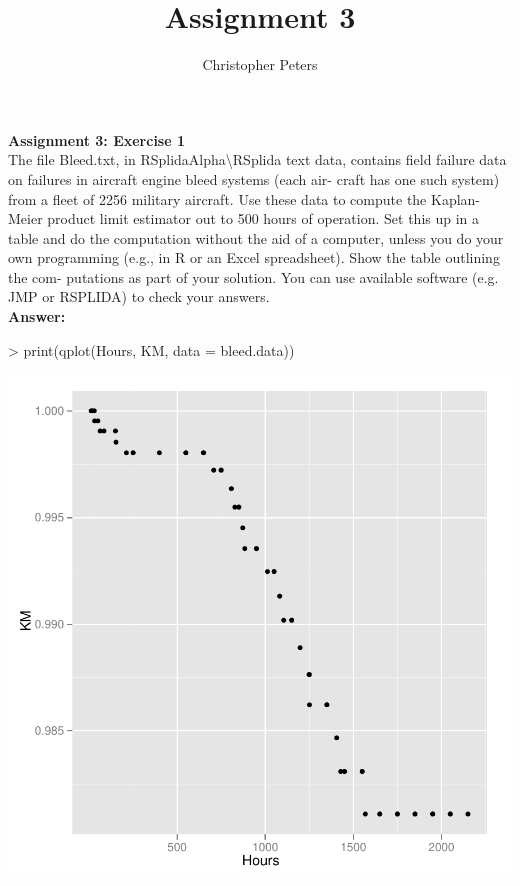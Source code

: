 \documentclass{article}
\begin{document}
\title{Assignment 3}
\author{Christopher Peters}
\maketitle

{\bf Assignment 3: Exercise 1}\\

The file Bleed.txt, in RSplidaAlpha\textbackslash RSplida text data, contains
field failure data on failures in aircraft engine bleed systems (each air-
craft has one such system) from a fleet of 2256 military aircraft. Use
these data to compute the Kaplan-Meier product limit estimator out to
500 hours of operation. Set this up in a table and do the computation
without the aid of a computer, unless you do your own programming
(e.g., in R or an Excel spreadsheet). Show the table outlining the com-
putations as part of your solution. You can use available software (e.g.
JMP or RSPLIDA) to check your answers.\\


{\bf Answer:}




\begin{center}
\begin{Schunk}
\begin{Sinput}
> print(qplot(Hours, KM, data = bleed.data))
\end{Sinput}
\end{Schunk}
\includegraphics{assignment3_sweave-004}
\end{center}  
\end{document}
